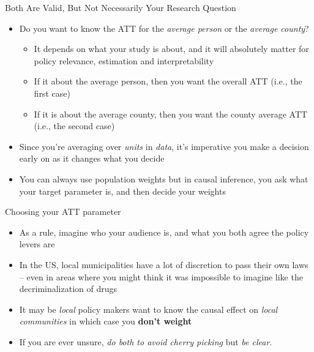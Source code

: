 \documentclass{beamer}
\begin{document}
\begin{frame}{Both Are Valid, But Not Necessarily Your Research Question}

\begin{itemize}
\item Do you want to know the ATT for the \emph{average person} or the \emph{average county}?
	\begin{itemize}
	\item It depends on what your study is about, and it will absolutely matter for policy relevance, estimation and interpretability
	\item If it about the average person, then you want the overall ATT (i.e., the first case)
	\item If it is about the average county, then you want the county average ATT (i.e., the second case)
	\end{itemize}
\item Since you're averaging over \emph{units} in \emph{data}, it's imperative you make a decision early on as it changes what you decide
\item You can always use population weights but in causal inference, you ask what your target parameter is, and then decide your weights
\end{itemize}

\end{frame}

\begin{frame}{Choosing your ATT parameter}

\begin{itemize}

\item As a rule, imagine who your audience is, and what you both agree the policy levers are
\item In the US, local municipalities have a lot of discretion to pass their own laws -- even in areas where you might think it was impossible to imagine like the decriminalization of drugs
\item It may be \emph{local} policy makers want to know the causal effect on \emph{local communities} in which case you \textbf{don't weight}
\item If you are ever unsure, \emph{do both to avoid cherry picking} but \emph{be clear}.

\end{itemize}

\end{frame}
\end{document}
